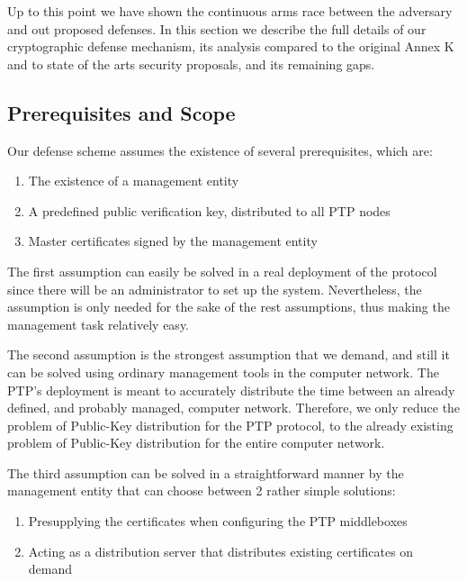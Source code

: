 \documentclass[11pt]{article}
\begin{document}
Up to this point we have shown the continuous arms race between the adversary and out proposed defenses. In this section we describe the full details of our cryptographic defense mechanism, its analysis compared to the original Annex K and to state of the arts security proposals, and its remaining gaps.



\subsection{Prerequisites and Scope}\label{overview:pre}

Our defense scheme assumes the existence of several prerequisites, which are:

\begin{enumerate}

  \item The existence of a management entity

  \item A predefined public verification key, distributed to all PTP nodes

  \item Master certificates signed by the management entity

\end{enumerate}



The first assumption can easily be solved in a real deployment of the protocol since there will be an administrator to set up the system. Nevertheless, the assumption is only needed for the sake of the rest assumptions, thus making the management task relatively easy.



The second assumption is the strongest assumption that we demand, and still it can be solved using ordinary management tools in the computer network. The PTP's deployment is meant to accurately distribute the time between an already defined, and probably managed, computer network. Therefore, we only reduce the problem of Public-Key distribution for the PTP protocol, to the already existing problem of Public-Key distribution for the entire computer network.



The third assumption can be solved in a straightforward manner by the management entity that can choose between 2 rather simple solutions:

\begin{enumerate}

  \item Presupplying the certificates when configuring the PTP middleboxes

  \item Acting as a distribution server that distributes existing certificates on demand

\end{enumerate}
\end{document}
